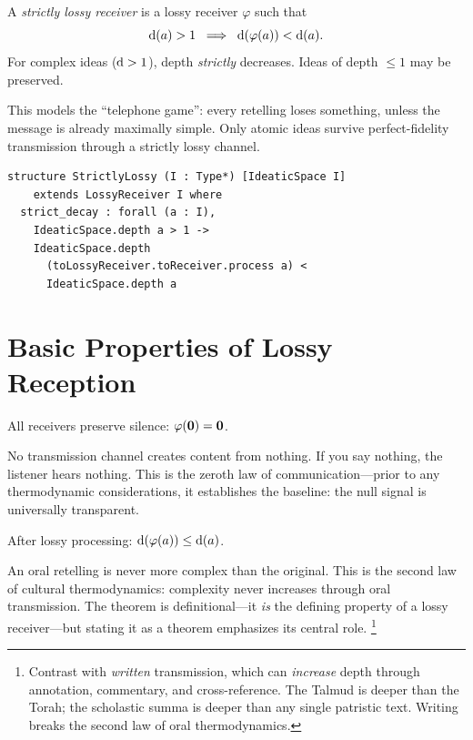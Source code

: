 \begin{definition}
\label{def:strictly-lossy}
A \emph{strictly lossy receiver} is a lossy receiver $\varphi$ such that
\[
  \operatorname{d}(a) > 1 \;\implies\;
  \operatorname{d}(\varphi(a)) < \operatorname{d}(a).
\]
For complex ideas ($\operatorname{d} > 1$), depth \emph{strictly} decreases.  Ideas of
depth $\le 1$ may be preserved.
\end{definition}

This models the ``telephone game'': every retelling loses something, unless
the message is already maximally simple.  Only atomic ideas survive
perfect-fidelity transmission through a strictly lossy channel.

\begin{lstlisting}[caption={Strictly lossy receiver in Lean~4.}]
structure StrictlyLossy (I : Type*) [IdeaticSpace I]
    extends LossyReceiver I where
  strict_decay : forall (a : I),
    IdeaticSpace.depth a > 1 ->
    IdeaticSpace.depth
      (toLossyReceiver.toReceiver.process a) <
      IdeaticSpace.depth a
\end{lstlisting}


\section{Basic Properties of Lossy Reception}
\label{sec:lossy-basic}

\begin{theorem}
\label{thm:lossy-void-preservation}
All receivers preserve silence: $\varphi(\mathbf{0}) = \mathbf{0}$.
\end{theorem}

No transmission channel creates content from nothing.  If you say nothing,
the listener hears nothing.  This is the zeroth law of communication---prior
to any thermodynamic considerations, it establishes the baseline: the null
signal is universally transparent.

\begin{theorem}
\label{thm:lossy-depth-bound}
After lossy processing: $\operatorname{d}(\varphi(a)) \le \operatorname{d}(a)$.
\end{theorem}

An oral retelling is never more complex than the original.  This is the
second law of cultural thermodynamics: complexity never increases through
oral transmission.  The theorem is definitional---it \emph{is} the defining
property of a lossy receiver---but stating it as a theorem emphasizes its
central role.%
\footnote{Contrast with \emph{written} transmission, which can \emph{increase}
depth through annotation, commentary, and cross-reference.  The Talmud is
deeper than the Torah; the scholastic summa is deeper than any single
patristic text.  Writing breaks the second law of oral thermodynamics.}

